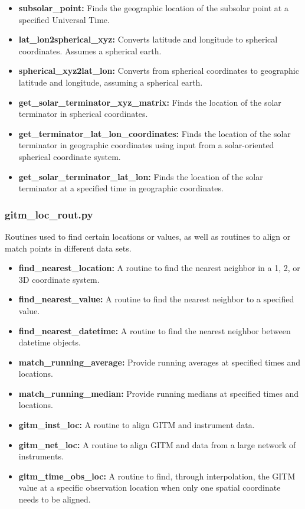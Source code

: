 \begin{itemize}
\item[]{\bf subsolar\_point: } Finds the geographic location of the subsolar point at a specified Universal Time.
\item[]{\bf lat\_lon2spherical\_xyz: } Converts latitude and longitude to spherical coordinates.  Assumes a spherical earth.
\item[]{\bf spherical\_xyz2lat\_lon: } Converts from spherical coordinates to geographic latitude and longitude, assuming a spherical earth.
\item[]{\bf get\_solar\_terminator\_xyz\_matrix: } Finds the location of the solar terminator in spherical coordinates.
\item[]{\bf get\_terminator\_lat\_lon\_coordinates: } Finds the location of the solar terminator in geographic coordinates using input from a solar-oriented spherical coordinate system.
\item[]{\bf get\_solar\_terminator\_lat\_lon: } Finds the location of the solar terminator at a specified time in geographic coordinates.
\end{itemize}

\subsubsection{gitm\_loc\_rout.py}

Routines used to find certain locations or values, as well as routines to align or match points in different data sets.

\begin{itemize}
\item[]{\bf find\_nearest\_location: } A routine to find the nearest neighbor in a 1, 2, or 3D coordinate system.
\item[]{\bf find\_nearest\_value: } A routine to find the nearest neighbor to a specified value.
\item[]{\bf find\_nearest\_datetime: } A routine to find the nearest neighbor between datetime objects.
\item[]{\bf match\_running\_average: } Provide running averages at specified times and locations.
\item[]{\bf match\_running\_median: } Provide running medians at specified times and locations.
\item[]{\bf gitm\_inst\_loc: } A routine to align GITM and instrument data.
\item[]{\bf gitm\_net\_loc: } A routine to align GITM and data from a large network of instruments.
\item[]{\bf gitm\_time\_obs\_loc: } A routine to find, through interpolation, the GITM value at a specific observation location when only one spatial coordinate needs to be aligned.
\end{itemize} 

